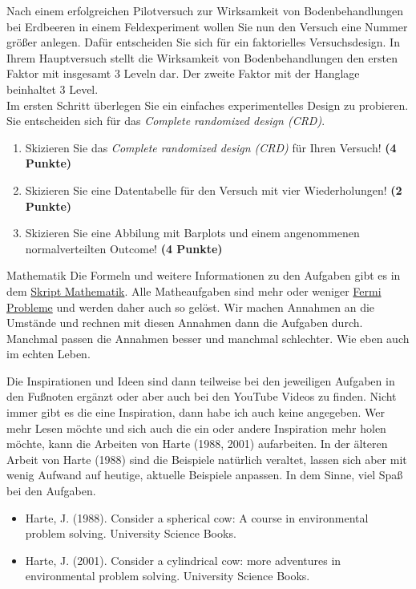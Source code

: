 \documentclass[a4paper, 9pt]{scrartcl}\usepackage[]{graphicx}\usepackage[]{xcolor}
\begin{document}
Nach einem erfolgreichen Pilotversuch zur Wirksamkeit von Bodenbehandlungen bei
Erdbeeren in einem Feldexperiment wollen Sie nun den Versuch eine Nummer gr{\"o}{\ss}er
anlegen. Daf{\"u}r entscheiden Sie sich f{\"u}r ein faktorielles Versuchsdesign. In
Ihrem Hauptversuch stellt die Wirksamkeit von Bodenbehandlungen den ersten Faktor
mit insgesamt 3 Leveln dar. Der zweite Faktor mit der Hanglage
beinhaltet
3 Level. \\

Im ersten Schritt {\"u}berlegen Sie ein einfaches experimentelles Design zu
probieren. Sie entscheiden sich f{\"u}r das \textit{Complete randomized design (CRD)}.

\begin{enumerate}
  \setcounter{enumi}{0}
\item Skizieren Sie das \textit{Complete randomized design (CRD)} f{\"u}r Ihren Versuch!
  \textbf{(4 Punkte)}
\item Skizieren Sie eine Datentabelle f{\"u}r den Versuch mit vier
  Wiederholungen! \textbf{(2 Punkte)}
\item Skizieren Sie eine Abbilung mit Barplots und einem angenommenen
  normalverteilten Outcome! \textbf{(4 Punkte)}
\end{enumerate}


 
\clearpage
\begin{graybox}{Mathematik}
Die Formeln und weitere Informationen zu den Aufgaben gibt es in dem \href{https://jkruppa.github.io/math/}{Skript Mathematik}. Alle Matheaufgaben sind mehr oder weniger \href{https://de.wikipedia.org/wiki/Fermi-Problem}{Fermi Probleme} und werden daher auch so gel{\"o}st. Wir machen Annahmen an die Umst{\"a}nde und rechnen mit diesen Annahmen dann die Aufgaben durch. Manchmal passen die Annahmen besser und manchmal schlechter. Wie eben auch im echten Leben.

Die Inspirationen und Ideen sind dann teilweise bei den jeweiligen Aufgaben in den Fu{\ss}noten erg{\"a}nzt oder aber auch bei den YouTube Videos zu finden. Nicht immer gibt es die eine Inspiration, dann habe ich auch keine angegeben. Wer mehr Lesen m{\"o}chte und sich auch die ein oder andere Inspiration mehr holen m{\"o}chte, kann die Arbeiten von Harte (1988, 2001) aufarbeiten. In der {\"a}lteren Arbeit von Harte (1988) sind die Beispiele nat{\"u}rlich veraltet, lassen sich aber mit wenig Aufwand auf heutige, aktuelle Beispiele anpassen. In dem Sinne, viel Spa{\ss} bei den Aufgaben.

\begin{itemize}
\item Harte, J. (1988). Consider a spherical cow: A course in environmental problem solving. University Science Books.
\item Harte, J. (2001). Consider a cylindrical cow: more adventures in environmental problem solving. University Science Books.
\end{itemize}
\end{graybox}
\clearpage
\end{document}
